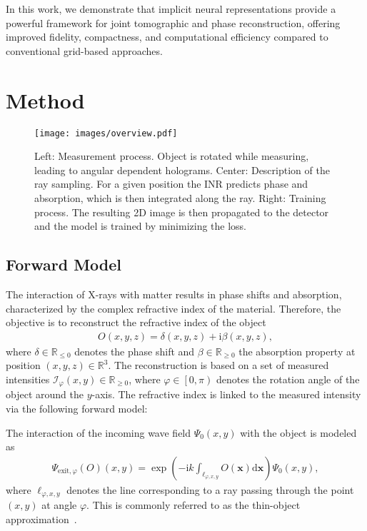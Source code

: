 \documentclass{article}
\def\x{{\mathbf x}}
\begin{document}
In this work, we demonstrate that implicit neural representations provide a powerful framework for joint tomographic and phase reconstruction, offering improved fidelity, compactness, and computational efficiency compared to conventional grid-based approaches.
\section{Method}
\begin{figure*}
	\centering
	\texttt{[image: images/overview.pdf]}
	\caption{Left: Measurement process.
		Object is rotated while measuring, leading to angular dependent holograms.
		Center: Description of the ray sampling.
		For a given position the INR predicts phase and absorption, which is then integrated along the ray.
		Right: Training process.
		The resulting 2D image is then propagated to the detector and the model is trained by minimizing the loss.
	}
	\label{fig:overiew}
\end{figure*}

\subsection{Forward Model}
The interaction of X-rays with matter results in phase shifts and absorption, characterized by the complex refractive index of the material.
Therefore, the objective is to reconstruct the refractive index of the object  
\begin{align}
	O \left( x,y,z \right) = \delta \left( x,y,z \right) + \mathrm{i} \beta \left( x,y,z \right),
	\label{eq:refractive-index}
\end{align}
where $\delta \in \mathbb{R}_{\leq 0}$ denotes the phase shift and $\beta \in \mathbb{R}_{\geq 0}$ the absorption property at position $\left( x,y,z \right) \in \mathbb{R}^{3}$.  
The reconstruction is based on a set of measured intensities $\mathcal{I}_\varphi \left( x,y \right) \in \mathbb{R}_{\geq 0}$, where $\varphi \in \left[ 0, \pi \right)$ denotes the rotation angle of the object around the $y$-axis.  
The refractive index is linked to the measured intensity via the following forward model:

The interaction of the incoming wave field $\Psi_{0} \left( x,y \right)$ with the object is modeled as
\begin{align}
	\Psi_{\text{exit}, \varphi} \left( O \right) \left( x,y \right) =
	\exp \left( - \mathrm{i}k  \int_{\ell_{\varphi, x, y}} O \left( \x \right) \mathrm{d}\x \right) 
	\Psi_{0}\left( x,y \right),
\end{align}
where $\ell_{\varphi, x, y}$ denotes the line corresponding to a ray passing through the point $\left( x,y \right)$ at angle $\varphi$. This is commonly referred to as the thin-object approximation~\cite{paganinCoherentXrayOptics2006a}.  
\end{document}
